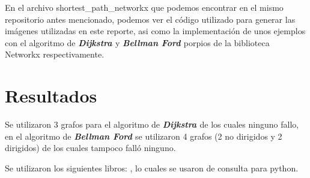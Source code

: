 \documentclass{report}
\newcommand{\dij}{{\bfseries {\textit{Dijkstra }}}}
\newcommand{\bell}{{\bfseries {\textit{Bellman Ford }}}}
\begin{document}
En el archivo shortest\_path\_networkx que podemos encontrar en el mismo repositorio antes mencionado, podemos ver el código utilizado para generar las imágenes utilizadas en este reporte, asi como la implementación de unos ejemplos con el algoritmo de \dij y \bell porpios de la biblioteca Networkx respectivamente.
\section{Resultados}
Se utilizaron 3 grafos para el algoritmo de \dij de los cuales ninguno fallo, en el algoritmo de \bell se utilizaron 4 grafos (2 no dirigidos y 2 dirigidos) de los cuales tampoco falló ninguno.

Se utilizaron los siguientes libros:
\cite{chun2001core}
\cite{van1991guia}
\cite{van2017tutorial}, lo cuales se usaron de consulta para python.


\end{document}
